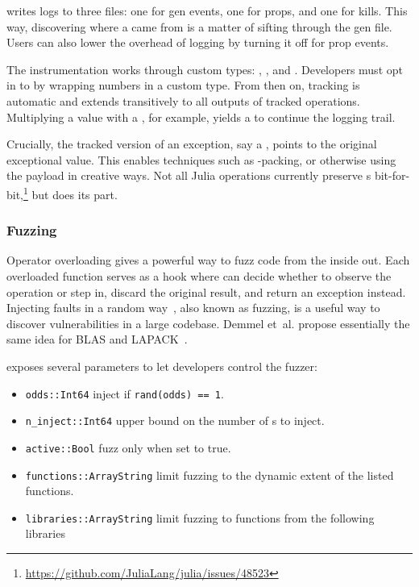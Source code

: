 \documentclass{juliacon}
\begin{document}
\FT{} writes logs to three files: one for {gen} events, one for {prop}s, and one for {kill}s.
This way, discovering where a \Nan{} came from is a matter of sifting through the {gen} file.
Users can also lower the overhead of logging by turning it off for prop events.

The instrumentation works through custom \fp{} types: ,
, and .
Developers must opt in to \FT{} by wrapping numbers in a custom type.
From then on, tracking is automatic and extends transitively to all outputs
of tracked operations.
Multiplying a  value with a , for example, yields
a  to continue the logging trail.

Crucially, the tracked version of an exception, say a \NaN{}, points
to the original exceptional value.
This enables techniques such as \NaN{}-packing, or otherwise
using the payload in creative ways.
Not all Julia operations currently preserve \NaN{}s
bit-for-bit,\footnote{\url{https://github.com/JuliaLang/julia/issues/48523}}
but \FT{} does its part.


\subsubsection{Fuzzing}

Operator overloading gives \FT{} a powerful way to fuzz code from the inside out.
Each overloaded function serves as a hook where \FT{} can decide whether to observe
the operation or step in, discard the original result, and return an exception instead.
Injecting faults in a random way~\cite{hamlet1994random}, also known as fuzzing,
is a useful way to discover vulnerabilities in a large codebase.
Demmel et~al. propose essentially the same idea for BLAS and
LAPACK~\cite{ddghlllprr-correctness-2022}.

\FT{} exposes several parameters to let developers control the fuzzer:

\begin{itemize}
\item \texttt{odds::Int64} inject if \texttt{rand(odds) == 1}.
\item \texttt{n\_inject::Int64} upper bound on the number of \Nan{}s to inject.
\item \texttt{active::Bool} fuzz only when set to true.
\item \texttt{functions::Array{String}} limit fuzzing to the dynamic extent of the listed functions.
\item \texttt{libraries::Array{String}} limit fuzzing to functions from the following libraries
\end{itemize}
\end{document}
